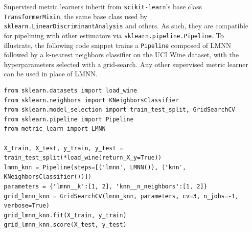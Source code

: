 \documentclass[twoside,11pt]{article}
\newcommand{\aurelien}[1]{\todo[inline,caption={},color=orange!40]{{\it Aurelien:~}#1}}
\begin{document}
Supervised metric learners inherit from \texttt{scikit-learn}'s base class \texttt{TransformerMixin}, the same base class used by \texttt{sklearn.LinearDiscriminantAnalysis} and others.
As such, they are compatible for pipelining with other estimators via \texttt{sklearn.pipeline.Pipeline}.
To illustrate, the following code snippet trains a \texttt{Pipeline} composed of LMNN followed by a k-nearest neighbors classifier on the UCI Wine dataset, with the hyperparameters selected with a grid-search. Any other supervised metric learner can be used in place of LMNN.
\begin{verbatim}
from sklearn.datasets import load_wine
from sklearn.neighbors import KNeighborsClassifier
from sklearn.model_selection import train_test_split, GridSearchCV
from sklearn.pipeline import Pipeline
from metric_learn import LMNN

X_train, X_test, y_train, y_test = train_test_split(*load_wine(return_X_y=True))
lmnn_knn = Pipeline(steps=[('lmnn', LMNN()), ('knn', KNeighborsClassifier())])
parameters = {'lmnn__k':[1, 2], 'knn__n_neighbors':[1, 2]}
grid_lmnn_knn = GridSearchCV(lmnn_knn, parameters, cv=3, n_jobs=-1, verbose=True)
grid_lmnn_knn.fit(X_train, y_train)
grid_lmnn_knn.score(X_test, y_test)
\end{verbatim}

\end{document}

